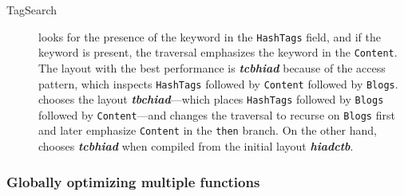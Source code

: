 \begin{description}
\item[TagSearch]
looks for the presence of the keyword in the \lstinline{HashTags} field, and
if the keyword is present, the traversal emphasizes the keyword in the \lstinline{Content}.
%
%
%
The layout with the best performance is
\textbf{\textit{tcbhiad}} because of the
access pattern, which inspects \lstinline{HashTags} followed by \lstinline{Content} followed by \lstinline{Blogs}.
\systemSolver chooses the layout \textbf{\textit{tbchiad}}---which places \lstinline|HashTags| followed by \lstinline|Blogs|
followed by \lstinline|Content|---and changes the traversal to recurse on \lstinline|Blogs| first and later emphasize
\lstinline|Content| in the \lstinline|then| branch.
On the other hand, \systemGreedy chooses \textbf{\textit{tcbhiad}}
when compiled from the initial layout \textbf{\textit{hiadctb}}.


\end{description}

\subsubsection{\bf Globally optimizing multiple functions}

